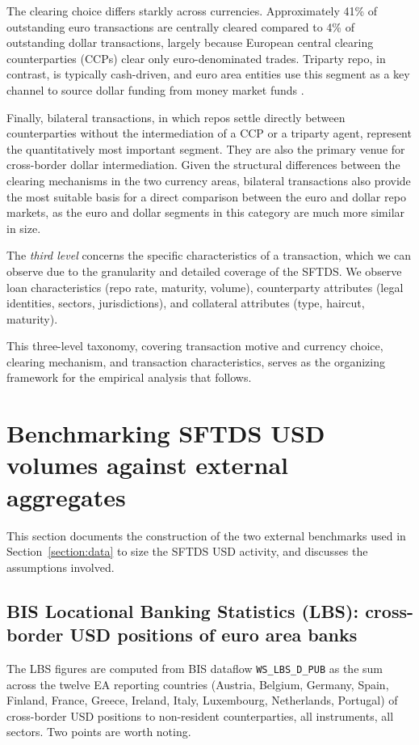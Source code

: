 \documentclass[english, 12pt, oneside]{article}
\begin{document}
The clearing choice differs starkly across currencies. Approximately 41\% of outstanding euro transactions are centrally cleared compared to 4\% of outstanding dollar transactions, largely because European central clearing counterparties (CCPs) clear only euro-denominated trades. Triparty repo, in contrast, is typically cash-driven, and euro area entities use this segment as a key channel to source dollar funding from money market funds \citep{chernenko2014,eren2020, aldasoro2022}.

Finally, bilateral transactions, in which repos settle directly between counterparties without the intermediation of a CCP or a triparty agent, represent the quantitatively most important segment. They are also the primary venue for cross-border dollar intermediation. Given the structural differences between the clearing mechanisms in the two currency areas, bilateral transactions also provide the most suitable basis for a direct comparison between the euro and dollar repo markets, as the euro and dollar segments in this category are much more similar in size.  

The \emph{third level} concerns the specific characteristics of a transaction, which we can observe due to the granularity and detailed coverage of the SFTDS. We observe  loan characteristics (repo rate, maturity, volume), counterparty attributes (legal identities, sectors, jurisdictions), and collateral attributes (type, haircut, maturity).

This three-level taxonomy, covering transaction motive and currency choice, clearing mechanism, and transaction characteristics, serves as the organizing framework for the empirical analysis that follows.


\section{Benchmarking SFTDS USD volumes against external aggregates}
\label{sec:bisbenchmark}

This section documents the construction of the two external benchmarks used in Section~\ref{section:data} to size the SFTDS USD activity, and discusses the assumptions involved.

\subsection*{BIS Locational Banking Statistics (LBS): cross-border USD positions of euro area banks}

The LBS figures are computed from BIS dataflow \texttt{WS\_LBS\_D\_PUB}  as the sum across the twelve EA reporting countries (Austria, Belgium, Germany, Spain, Finland, France, Greece, Ireland, Italy, Luxembourg, Netherlands, Portugal) of cross-border USD positions to non-resident counterparties, all instruments, all sectors. Two points are worth noting.
\end{document}
